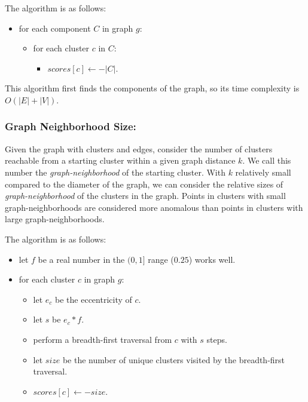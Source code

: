 The algorithm is as follows:

\begin{itemize}
    \item for each component $C$ in graph $g$:
    \begin{itemize}
        \item for each cluster $c$ in $C$:
        \begin{itemize}
            \item $scores[c] \leftarrow -|C|$.
        \end{itemize}
    \end{itemize}
\end{itemize}

This algorithm first finds the components of the graph, so its time complexity is $O(|E| + |V|)$.

\subsubsection{Graph Neighborhood Size:}
Given the graph with clusters and edges, consider the number of clusters reachable from a starting cluster within a given graph distance $k$.
We call this number the \textit{graph-neighborhood} of the starting cluster.
With $k$ relatively small compared to the diameter of the graph, we can consider the relative sizes of \textit{graph-neighborhood} of the clusters in the graph.
Points in clusters with small graph-neighborhoods are considered more anomalous than points in clusters with large graph-neighborhoods.

The algorithm is as follows:

\begin{itemize}
    \item let $f$ be a real number in the $(0, 1]$ range ($0.25$) works well.
    \item for each cluster $c$ in graph $g$:
    \begin{itemize}
        \item let $e_c$ be the eccentricity of $c$.
        \item let $s$ be $e_c * f$.
        \item perform a breadth-first traversal from $c$ with $s$ steps.
        \item let $size$ be the number of unique clusters visited by the breadth-first traversal.
        \item $scores[c] \leftarrow -size$.
    \end{itemize}
\end{itemize}

